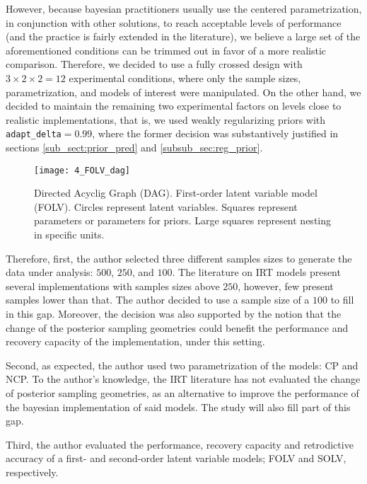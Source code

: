 However, because bayesian practitioners usually use the centered parametrization, in conjunction with other solutions, to reach acceptable levels of performance (and the practice is fairly extended in the literature), we believe a large set of the aforementioned conditions can be trimmed out in favor of a more realistic comparison. Therefore, we decided to use a fully crossed design with $3 \times 2 \times 2 = 12$ experimental conditions, where only the sample sizes, parametrization, and models of interest were manipulated. On the other hand, we decided to maintain the remaining two experimental factors on levels close to realistic implementations, that is, we used weakly regularizing priors with \texttt{adapt\_delta}$=0.99$, where the former decision was substantively justified in sections \ref{sub_sect:prior_pred} and \ref{subsub_sec:reg_prior}.
%
\begin{figure}[H]
	\centering
	\texttt{[image: 4\_FOLV\_dag]}
	\caption[Directed Acyclig Graph (DAG). First-order latent variable model (FOLV).]%
	{Directed Acyclig Graph (DAG). First-order latent variable model (FOLV). Circles represent latent variables. Squares represent parameters or parameters for priors. Large squares represent nesting in specific units.}
	\label{fig:FOLV_model}
\end{figure}

Therefore, first, the author selected three different samples sizes to generate the data under analysis: $500$, $250$, and $100$. The literature on IRT models present several implementations with samples sizes above $250$, however, few present samples lower than that. The author decided to use a sample size of a $100$ to fill in this gap. Moreover, the decision was also supported by the notion that the change of the posterior sampling geometries could benefit the performance and recovery capacity of the implementation, under this setting.

Second, as expected, the author used two parametrization of the models: CP and NCP. To the author's knowledge, the IRT literature has not evaluated the change of posterior sampling geometries, as an alternative to improve the performance of the bayesian implementation of said models. The study will also fill part of this gap.

Third, the author evaluated the performance, recovery capacity and retrodictive accuracy of a first- and second-order latent variable models; FOLV and SOLV, respectively.


